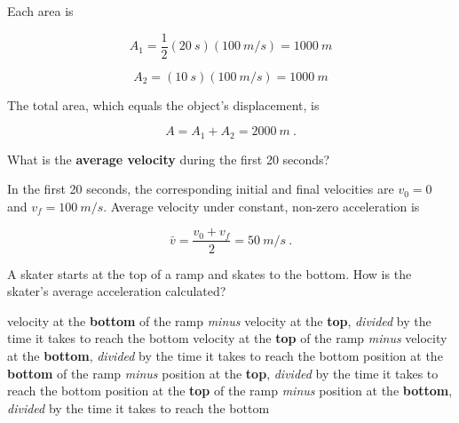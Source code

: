 \documentclass[../main-physics-problems.tex]{subfiles}
\begin{document}
\begin{questions}
\begin{solutionorbox}[2.5in]
Each area is

\begin{equation*}
    A_1 = \frac{1}{2}\left(\SI{20}{s}\right)\left(\SI{100}{m/s}\right) = \SI{1000}{m}
\end{equation*}

\begin{equation*}
    A_2 = (\SI{10}{s})(\SI{100}{m/s}) = \SI{1000}{m}
\end{equation*}

The total area, which equals the object's displacement, is

\begin{equation*}
    A = A_1 + A_2 = \SI{2000}{m}\ .
\end{equation*}

\end{solutionorbox}


\question
What is the \textbf{average velocity} during the first 20 seconds?

\begin{solutionorbox}[2.5in]

In the first 20 seconds, the corresponding initial and final velocities are $v_0 = 0$ and $v_f = \SI{100}{m/s}$. Average velocity under constant, non-zero acceleration is

\begin{equation*}
    \bar{v} = \frac{v_0 + v_f}{2} = \SI{50}{m/s}\ .
\end{equation*}

\end{solutionorbox}

\question %
A skater starts at the top of a ramp and skates to the bottom. How is the skater's average acceleration calculated?

\begin{choices}
\CorrectChoice velocity at the \textbf{bottom} of the ramp \textit{minus} velocity at the \textbf{top}, \textit{divided} by the time it takes to reach the bottom
\choice velocity at the \textbf{top} of the ramp \textit{minus} velocity at the \textbf{bottom}, \textit{divided} by the time it takes to reach the bottom
\choice position at the \textbf{bottom} of the ramp \textit{minus} position at the \textbf{top}, \textit{divided} by the time it takes to reach the bottom
\choice position at the \textbf{top} of the ramp \textit{minus} position at the \textbf{bottom}, \textit{divided} by the time it takes to reach the bottom
\end{choices}



\end{questions}
\end{document}
